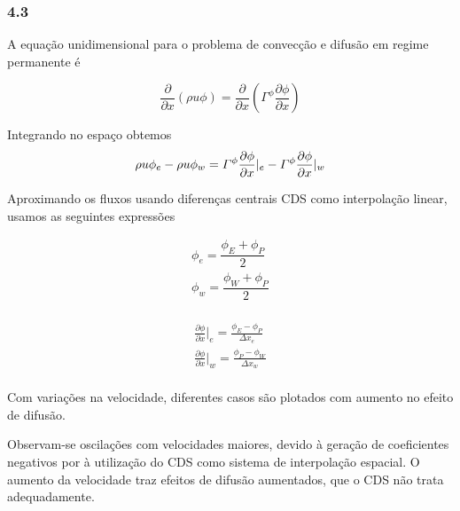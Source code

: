\documentclass[]{article}
\begin{document}
\subsubsection*{4.3}

A equação unidimensional para o problema de convecção e difusão em regime permanente é

\begin{equation}
	\frac{\partial}{\partial x} \left( \rho u \phi \right) = \frac{\partial}{\partial x} \left( \Gamma^\phi \frac{\partial \phi}{\partial x} \right)
\end{equation}

Integrando no espaço obtemos\\

\begin{equation}
	 \rho u \phi _e -  \rho u \phi_w =  \varGamma^\phi \frac{\partial \phi}{\partial x}\arrowvert_e - \varGamma^\phi \frac{\partial \phi}{\partial x}\arrowvert_w
\end{equation}


Aproximando os fluxos usando diferenças centrais CDS como interpolação linear, usamos as seguintes expressões

\begin{equation}
	\begin{aligned}
		\phi_{e} = \dfrac{\phi_{E} + \phi_{P}}{2} \\
		\phi_{w} = \dfrac{\phi_{W} + \phi_{P}}{2} \\
	\end{aligned}
\end{equation}

\begin{equation}
	\begin{aligned}
		\frac{\partial\phi}{\partial x}\bigg|_{e} = \frac{\phi_{E}-\phi_{P}}{\Delta x_{e}}\\
		\frac{\partial\phi}{\partial x}\bigg|_{w} = \frac{\phi_{P}-\phi_{W}}{\Delta x_{w}}\\
	\end{aligned}
\end{equation}

Com variações na velocidade, diferentes casos são plotados com aumento no efeito de difusão.


Observam-se oscilações com velocidades maiores, devido à geração de coeficientes negativos por à utilização do CDS como sistema de interpolação espacial. O aumento da velocidade traz efeitos de difusão aumentados, que o CDS não trata adequadamente.\\
\end{document}
